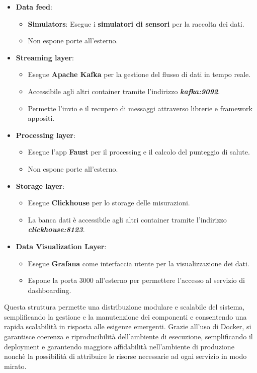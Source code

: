 \begin{itemize}
    \item \textbf{Data feed}:
    \begin{itemize}
        \item \textbf{Simulators}: Esegue i \textbf{simulatori di sensori} per la raccolta dei dati.
        \item Non espone porte all’esterno.
    \end{itemize} 
    \item \textbf{Streaming layer}:
    \begin{itemize}
        \item Esegue \textbf{Apache Kafka} per la gestione del flusso di dati in tempo reale.
        \item Accessibile agli altri container tramite l'indirizzo \textit{\textbf{kafka:9092}}.
        \item Permette l'invio e il recupero di messaggi attraverso librerie e framework appositi.
    \end{itemize} 
    \item \textbf{Processing layer}:
    \begin{itemize}
        \item Esegue l'app \textbf{Faust} per il processing e il calcolo del punteggio di salute.
        \item Non espone porte all'esterno.
    \end{itemize}
    \item \textbf{Storage layer}:
    \begin{itemize}
        \item Esegue \textbf{Clickhouse} per lo storage delle misurazioni.
        \item La banca dati è accessibile agli altri container tramite l'indirizzo \textit{\textbf{clickhouse:8123}}.
    \end{itemize}
    \item \textbf{Data Visualization Layer}:
    \begin{itemize}
        \item Esegue \textbf{Grafana} come interfaccia utente per la visualizzazione dei dati.
        \item Espone la porta 3000 all'esterno per permettere l'accesso al servizio di dashboarding.
    \end{itemize}
\end{itemize}
Questa struttura permette una distribuzione modulare e scalabile del sistema, semplificando la gestione e la manutenzione dei componenti e consentendo una rapida scalabilità in risposta alle esigenze emergenti. Grazie all'uso di Docker, si garantisce coerenza e riproducibilità dell'ambiente di esecuzione, semplificando il deployment e garantendo maggiore affidabilità nell'ambiente di produzione nonchè la possibilità di attribuire le risorse necessarie ad ogni servizio in modo mirato.


